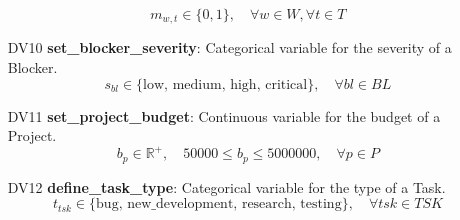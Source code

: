 \documentclass[11pt]{article}
\begin{document}
\begin{itemize}
    $$ m_{w, t} \in \{0, 1\}, \quad \forall w \in W, \forall t \in T $$
    \item[DV10] \textbf{set\_blocker\_severity}: Categorical variable for the severity of a Blocker.
    $$ s_{bl} \in \{\text{low, medium, high, critical}\}, \quad \forall bl \in BL $$
    \item[DV11] \textbf{set\_project\_budget}: Continuous variable for the budget of a Project.
    $$ b_p \in \mathbb{R}^+, \quad 50000 \leq b_p \leq 5000000, \quad \forall p \in P $$
    \item[DV12] \textbf{define\_task\_type}: Categorical variable for the type of a Task.
    $$ t_{tsk} \in \{\text{bug, new\_development, research, testing}\}, \quad \forall tsk \in TSK $$
\end{itemize}
\end{document}
